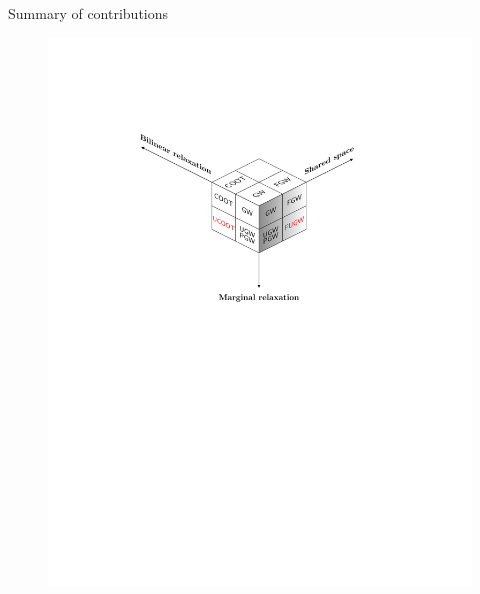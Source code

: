\documentclass{beamer}
\begin{document}
\begin{frame}{Summary of contributions}
  \vspace{-1cm}
  \begin{figure}
    \centering
    \includegraphics[width=1.1\linewidth, keepaspectratio=true]{OT_new/cube_fugw.pdf}
  \end{figure}
\end{frame}
\end{document}

